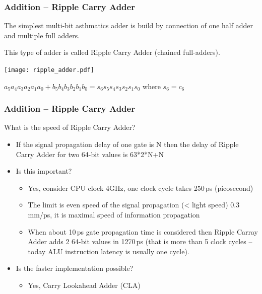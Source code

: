 \documentclass{beamer}
\begin{document}
\begin{frame}
\frametitle{Addition -- Ripple Carry Adder}

The simplest multi-bit asthmatics adder is build by connection of one half adder and multiple full adders.

This type of adder is called Ripple Carry Adder (chained full-adders).

\begin{center}
   \texttt{[image: ripple\_adder.pdf]}
\end{center}

$a_5a_4a_3a_2a_1a_0 + b_5b_4b_3b_2b_1b_0 = s_6s_5s_4s_3s_2s_1s_0$ where $s_6 = c_6$

\end{frame}

\begin{frame}
\frametitle{Addition -- Ripple Carry Adder}

What is the speed of Ripple Carry Adder?
\begin{itemize}
\item If the signal propagation delay of one gate is N then the delay of Ripple Carry Adder for two 64-bit values is 63*2*N+N
\item Is this important?
\begin{itemize}
\item Yes, consider CPU clock 4GHz, one clock cycle takes 250\,ps (picosecond)
\item The limit is even speed of the signal propagation (< light speed) 0.3\,mm/ps, it is maximal speed of information propagation
\item When about 10\,ps gate propagation time is considered then Ripple Carray Adder adds 2 64-bit values in 1270\,ps (that is more than 5 clock cycles -- today ALU instruction latency is usually one cycle).
\end{itemize}
\item Is the faster implementation possible?
\begin{itemize}
\item Yes, Carry Lookahead Adder (CLA)
\end{itemize}
\end{itemize}

\end{frame}
\end{document}
